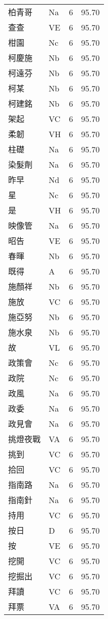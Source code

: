 \documentclass[twocolumn]{book}
\begin{document}
\begin{supertabular}{llrr}
柏青哥 & Na & 6 &  95.70\\
查查 & VE & 6 &  95.70\\
柑園 & Nc & 6 &  95.70\\
柯慶施 & Nb & 6 &  95.70\\
柯遠芬 & Nb & 6 &  95.70\\
柯某 & Nb & 6 &  95.70\\
柯建銘 & Nb & 6 &  95.70\\
架起 & VC & 6 &  95.70\\
柔韌 & VH & 6 &  95.70\\
柱礎 & Na & 6 &  95.70\\
染髮劑 & Na & 6 &  95.70\\
昨早 & Nd & 6 &  95.70\\
星 & Nc & 6 &  95.70\\
是 & VH & 6 &  95.70\\
映像管 & Na & 6 &  95.70\\
昭告 & VE & 6 &  95.70\\
春暉 & Nb & 6 &  95.70\\
既得 & A & 6 &  95.70\\
施顏祥 & Nb & 6 &  95.70\\
施放 & VC & 6 &  95.70\\
施亞努 & Nb & 6 &  95.70\\
施水泉 & Nb & 6 &  95.70\\
故 & VL & 6 &  95.70\\
政策會 & Nc & 6 &  95.70\\
政院 & Nc & 6 &  95.70\\
政風 & Na & 6 &  95.70\\
政委 & Na & 6 &  95.70\\
政見會 & Na & 6 &  95.70\\
挑燈夜戰 & VA & 6 &  95.70\\
挑到 & VC & 6 &  95.70\\
拾回 & VC & 6 &  95.70\\
指南路 & Na & 6 &  95.70\\
指南針 & Na & 6 &  95.70\\
持用 & VC & 6 &  95.70\\
按日 & D & 6 &  95.70\\
按 & VE & 6 &  95.70\\
挖開 & VC & 6 &  95.70\\
挖掘出 & VC & 6 &  95.70\\
拜讀 & VC & 6 &  95.70\\
拜票 & VA & 6 &  95.70\\

\end{supertabular}
\end{document}
